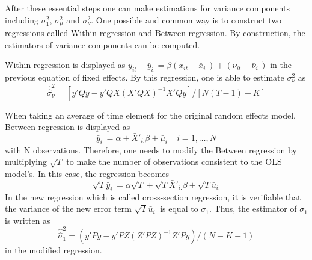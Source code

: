 \documentclass[11pt, a4paper, leqno]{article}
\begin{document}
After these essential steps one can make estimations for variance components including $\sigma_1^2$, $\sigma_\mu^2$ and $\sigma_\nu^2$. One possible and common way is to construct two regressions called Within regression and Between regression. By construction, the estimators of variance components can be computed.

Within regression is displayed as $y_{it} - \bar y_{i.} = \beta(x_{it} - \bar x_{i.}) + (\nu_{it} - \bar\nu_{i.})$ in the previous equation of fixed effects. By this regression, one is able to estimate $\sigma_\nu^2$ as 
    \begin{equation}
    {\widehat{\widehat{\sigma}}}_\nu^2 = [y'Qy - y'QX(X'QX)^{-1}X'Qy]/[N(T - 1) - K]
    \end{equation}

When taking an average of time element for the original random effects model, Between regression is displayed as 
    \begin{equation}
    \bar y_{i.} = \alpha + \bar X'_{i.}\beta + \bar \mu_{i.} \ \ \ \ i = 1, \ldots, N
    \end{equation}
with N observations. Therefore, one needs to modify the Between regression by multiplying $\sqrt T$ to make the number of observations consistent to the OLS model's. In this case, the regression becomes 
    \begin{equation}
    \sqrt T \bar y_{i.} = \alpha \sqrt T + \sqrt T \bar X'_{i.} \beta + \sqrt T \bar u_{i.}
    \end{equation}
In the new regression which is called cross-section regression, it is verifiable that the variance of the new error term $\sqrt T \bar u_{i.}$ is equal to $\sigma_1$. Thus, the estimator of $\sigma_1$ is written as
    \begin{equation}
    {\widehat{\widehat{\sigma}}}_1^2 = (y'Py - y'PZ(Z'PZ)^{-1}Z'Py)/(N - K -1)
    \end{equation}
in the modified regression.
\end{document}
